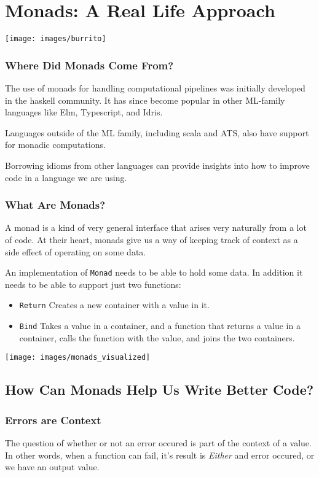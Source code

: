 \documentclass{beamer}
\begin{document}
\section{Monads: A Real Life Approach}
\begin{frame}
  \begin{center}
    \texttt{[image: images/burrito]}
  \end{center}
\end{frame}

\begin{frame}
  \frametitle{Where Did Monads Come From?}
  The use of monads for handling computational pipelines was initially
  developed in the haskell community.  It has since become popular in
  other ML-family languages like Elm, Typescript, and Idris.

  Languages outside of the ML family, including scala and ATS, also
  have support for monadic computations.

  Borrowing idioms from other languages can provide insights into how
  to improve code in a language we are using.
\end{frame}

\begin{frame}
  \frametitle{What Are Monads?}
  A monad is a kind of very general interface that arises very
  naturally from a lot of code.  At their heart, monads give us a way
  of keeping track of context as a side effect of operating on some
  data.

  \par\pause
  An implementation of {\tt Monad} needs to be able to hold some
  data. In addition it needs to be able to support just two functions:
  \begin{itemize}
  \item {\tt Return} Creates a new container with a value in it.
  \item {\tt Bind} Takes a value in a container, and a function that
    returns a value in a container, calls the function with the value,
    and joins the two containers.
  \end{itemize}
\end{frame}

\begin{frame}
  \begin{center}
    \texttt{[image: images/monads\_visualized]}
  \end{center}
\end{frame}

\subsection{How Can Monads Help Us Write Better Code?}
\begin{frame}
  \frametitle{Errors are Context}
  The question of whether or not an error occured is part of the
  context of a value.  In other words, when a function can fail, it's
  result is \emph{Either} and error occured, or we have an output
  value.
\end{frame}
\end{document}

